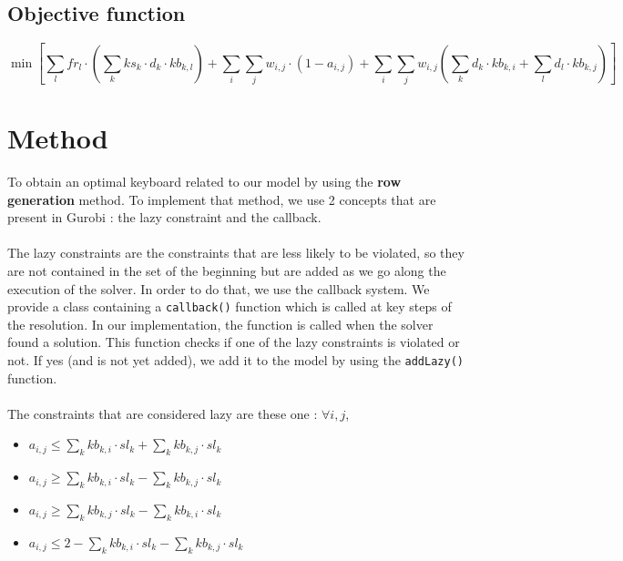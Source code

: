 \documentclass[a4paper,titlepage]{article}
\begin{document}
	\subsection{Objective function}

\[
	\min \left[ \sum_l fr_l \cdot \left( \sum_k ks_k \cdot d_k \cdot kb_{k,l}  \right) + \sum_i \sum_j w_{i,j} \cdot \left(1 - a_{i,j}\right) + \sum_i \sum_j w_{i,j} \left( \sum_k d_k \cdot kb_{k,i} + \sum_l d_l \cdot kb_{k,j} \right) \right]
\]



\section{Method}
To obtain an optimal keyboard related to our model by using the \textbf{row generation} method. To implement that method, we use 2 concepts that are present in Gurobi : the lazy constraint and the callback.
\paragraph{}
The lazy constraints are the constraints that are less likely to be violated, so they are not contained in the set of the beginning but are added as we go along the execution of the solver. In order to do that, we use the callback system. We provide a class containing a \texttt{callback()} function which is called at key steps of the resolution.
In our implementation, the function is called when the solver found a solution. This function checks if one of the lazy constraints is violated or not. If yes (and is not yet added), we add it to the model by using the \texttt{addLazy()} function.
\paragraph{}
The constraints that are considered lazy are these one : $\forall i,j$,
\begin{itemize}
	\item $a_{i,j} \leq \sum_k kb_{k,i} \cdot sl_k + \sum_k kb_{k,j} \cdot sl_k$

	\item $a_{i,j} \geq \sum_k kb_{k,i} \cdot sl_k - \sum_k kb_{k,j} \cdot sl_k$

	\item $a_{i,j} \geq \sum_k kb_{k,j} \cdot sl_k - \sum_k kb_{k,i} \cdot sl_k$

	\item $a_{i,j} \leq 2 - \sum_k kb_{k,i} \cdot sl_k - \sum_k kb_{k,j} \cdot sl_k$
\end{itemize}
\end{document}
